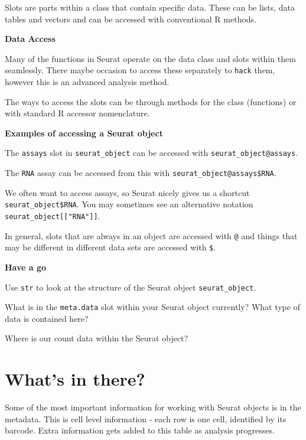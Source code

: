 \documentclass[
]{book}
\begin{document}
Slots are parts within a class that contain specific data. These can be lists, data tables and vectors and can be accessed with conventional R methods.

\textbf{Data Access}

Many of the functions in Seurat operate on the data class and slots within them seamlessly. There maybe occasion to access these separately to \texttt{hack} them, however this is an advanced analysis method.

The ways to access the slots can be through methods for the class (functions) or with standard R accessor nomenclature.

\textbf{Examples of accessing a Seurat object}

The \texttt{assays} slot in \texttt{seurat\_object} can be accessed with \texttt{seurat\_object@assays}.

The \texttt{RNA} assay can be accessed from this with \texttt{seurat\_object@assays\$RNA}.

We often want to access assays, so Seurat nicely gives us a shortcut \texttt{seurat\_object\$RNA}. You may sometimes see an alternative notation \texttt{seurat\_object{[}{[}"RNA"{]}{]}}.

In general, slots that are always in an object are accessed with \texttt{@} and things that may be different in different data sets are accessed with \texttt{\$}.

\textbf{Have a go}

Use \texttt{str} to look at the structure of the Seurat object \texttt{seurat\_object}.

What is in the \texttt{meta.data} slot within your Seurat object currently? What type of data is contained here?

Where is our count data within the Seurat object?

\hypertarget{whats-in-there}{%
\section{What's in there?}\label{whats-in-there}}

Some of the most important information for working with Seurat objects is in the metadata.
This is cell level information - each row is one cell, identified by its barcode.
Extra information gets added to this table as analysis progresses.
\end{document}
